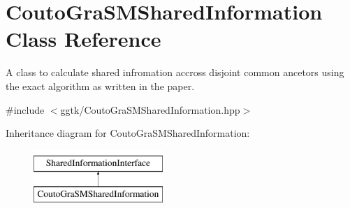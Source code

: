 \hypertarget{classCoutoGraSMSharedInformation}{}\section{Couto\+Gra\+S\+M\+Shared\+Information Class Reference}
\label{classCoutoGraSMSharedInformation}


A class to calculate shared infromation accross disjoint common ancetors using the exact algorithm as written in the paper.  




{\ttfamily \#include $<$ggtk/\+Couto\+Gra\+S\+M\+Shared\+Information.\+hpp$>$}

Inheritance diagram for Couto\+Gra\+S\+M\+Shared\+Information\+:\begin{figure}[H]
\begin{center}
\leavevmode
\includegraphics[height=2.000000cm]{classCoutoGraSMSharedInformation}
\end{center}
\end{figure}
